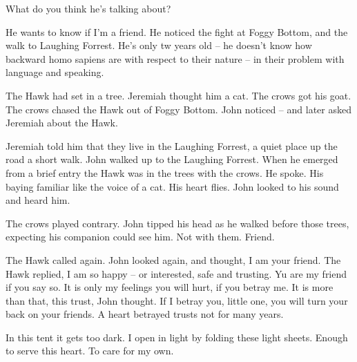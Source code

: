 

What do you think he's talking about?

He wants to know if I'm a friend.  He noticed the fight at Foggy
Bottom, and the walk to Laughing Forrest.  He's only tw years old --
he doesn't know how backward homo sapiens are with respect to their
nature -- in their problem with language and speaking.

The Hawk had set in a tree.  Jeremiah thought him a cat.  The crows
got his goat.  The crows chased the Hawk out of Foggy Bottom.  John
noticed -- and later asked Jeremiah about the Hawk.  

Jeremiah told him that they live in the Laughing Forrest, a quiet
place up the road a short walk.  John walked up to the Laughing
Forrest.  When he emerged from a brief entry the Hawk was in the trees
with the crows.  He spoke.  His baying familiar like the voice of a
cat.  His heart flies.  John looked to his sound and heard him.  

The crows played contrary.  John tipped his head as he walked before
those trees, expecting his companion could see him.  Not with them.
Friend.  

The Hawk called again.  John looked again, and thought, I am your
friend.  The Hawk replied, I am so happy -- or interested, safe and
trusting.  Yu are my friend if you say so.  It is only my feelings you
will hurt, if you betray me.  It is more than that, this trust, John
thought.  If I betray you, little one, you will turn your back on your
friends.  A heart betrayed trusts not for many years.

In this tent it gets too dark.  I open in light by folding these light
sheets.  Enough to serve this heart.  To care for my own.


\bye
